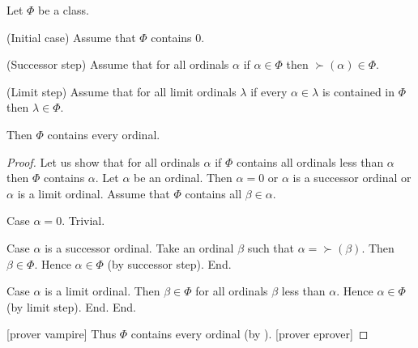 \documentclass[10pt]{article}
\begin{document}
  \begin{forthel}
    \begin{theorem}[id=SET_THEORY_02_7892040431960064,printid]
      Let $\Phi$ be a class.
      
      (Initial case) Assume that $\Phi$ contains $0$.
      
      (Successor step) Assume that for all ordinals $\alpha$ if $\alpha \in \Phi$ then $\succ(\alpha) \in \Phi$.
      
      (Limit step) Assume that for all limit ordinals $\lambda$ if every $\alpha \in \lambda$ is contained in $\Phi$ then $\lambda \in \Phi$.
      
      Then $\Phi$ contains every ordinal.
    \end{theorem}
    \begin{proof}
      Let us show that for all ordinals $\alpha$ if $\Phi$ contains all ordinals
      less than $\alpha$ then $\Phi$ contains $\alpha$.
        Let $\alpha$ be an ordinal.
        Then $\alpha = 0$ or $\alpha$ is a successor ordinal or $\alpha$ is a
        limit ordinal.
        Assume that $\Phi$ contains all $\beta \in \alpha$.

        Case $\alpha = 0$. Trivial.

        Case $\alpha$ is a successor ordinal.
          Take an ordinal $\beta$ such that $\alpha = \succ(\beta)$.
          Then $\beta \in \Phi$.
          Hence $\alpha \in \Phi$ (by successor step).
        End.

        Case $\alpha$ is a limit ordinal.
          Then $\beta \in \Phi$ for all ordinals $\beta$ less than $\alpha$.
          Hence $\alpha \in \Phi$ (by limit step).
        End.
      End.

      [prover vampire]
      Thus $\Phi$ contains every ordinal (by ).
      [prover eprover]
    \end{proof}
  \end{forthel}
\end{document}
